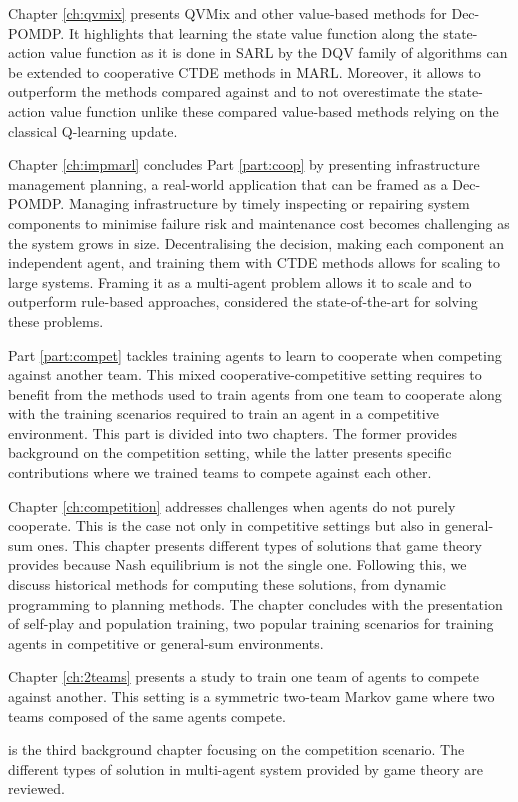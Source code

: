 Chapter \ref{ch:qvmix} presents QVMix and other value-based methods for Dec-POMDP.
It highlights that learning the state value function along the state-action value function as it is done in SARL by the DQV family of algorithms can be extended to cooperative CTDE methods in MARL.
Moreover, it allows to outperform the methods compared against and to not overestimate the state-action value function unlike these compared value-based methods relying on the classical Q-learning update.

Chapter \ref{ch:impmarl} concludes Part \ref{part:coop} by presenting infrastructure management planning, a real-world application that can be framed as a Dec-POMDP.
Managing infrastructure by timely inspecting or repairing system components to minimise failure risk and maintenance cost becomes challenging as the system grows in size.
Decentralising the decision, making each component an independent agent, and training them with CTDE methods allows for scaling to large systems.
Framing it as a multi-agent problem allows it to scale and to outperform rule-based approaches, considered the state-of-the-art for solving these problems.

Part \ref{part:compet} tackles training agents to learn to cooperate when competing against another team.
This mixed cooperative-competitive setting requires to benefit from the methods used to train agents from one team to cooperate along with the training scenarios required to train an agent in a competitive environment.
This part is divided into two chapters. 
The former provides background on the competition setting, while the latter presents specific contributions where we trained teams to compete against each other.

Chapter \ref{ch:competition} addresses challenges when agents do not purely cooperate.
This is the case not only in competitive settings but also in general-sum ones.
This chapter presents different types of solutions that game theory provides because Nash equilibrium is not the single one.
Following this, we discuss historical methods for computing these solutions, from dynamic programming to planning methods.
The chapter concludes with the presentation of self-play and population training, two popular training scenarios for training agents in competitive or general-sum environments.

Chapter \ref{ch:2teams} presents a study to train one team of agents to compete against another.
This setting is a symmetric two-team Markov game where two teams composed of the same agents compete.



is the third background chapter focusing on the competition scenario.
The different types of solution in multi-agent system provided by game theory are reviewed.
